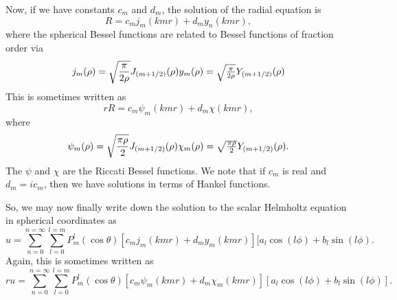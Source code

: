 \documentclass[12pt]{article}
\begin{document}
Now, if we have constants $c_m$ and $d_m$, the solution of the radial
equation is
\begin{equation}
R=c_m j_m (kmr)+d_m y_n(kmr),
\end{equation}
where the spherical Bessel functions are related to Bessel functions
of fraction order via
\begin{equation}
j_m(\rho)=\sqrt{\frac{\pi}{2 \rho}} J_{(m+1/2)}(\rho)
$$   $$
y_m(\rho)=\sqrt{\frac{\pi}{2 \rho}} Y_{(m+1/2)}(\rho)
\end{equation}
This is sometimes written as
\begin{equation}
r R=c_m \psi_m(kmr)+d_m \chi(kmr),
\end{equation}
where
\begin{equation}
\psi_m(\rho)=\sqrt{\frac{\pi \rho }{2 }} J_{(m+1/2)}(\rho)
$$   $$
\chi_m(\rho)=\sqrt{\frac{\pi \rho }{2 }} Y_{(m+1/2)}(\rho).
\end{equation}
The $\psi$ and $\chi$  are the Riccati Bessel functions.
We note that if $c_m$ is real and $d_m=i c_m$, then we have solutions in terms of Hankel functions.

So, we may now finally write down the solution to the scalar Helmholtz equation in spherical coordinates as
\begin{equation}
u=\sum_{n=0}^{n=\infty}
\sum_{l=0}^{l=m}
P_m^l(\cos \theta) [ c_m j_m(kmr)+d_m y_m(kmr) ] 
[a_l \cos (l \phi) +b_l \sin(l \phi).
\end{equation}
Again, this is sometimes written as
\begin{equation}
r u=\sum_{n=0}^{n=\infty}
\sum_{l=0}^{l=m}
P_m^l(\cos \theta) [ c_m \psi_m(kmr)+d_m \chi_m(kmr) ] 
[a_l \cos (l \phi) +b_l \sin(l \phi)].
\end{equation}
\end{document}
